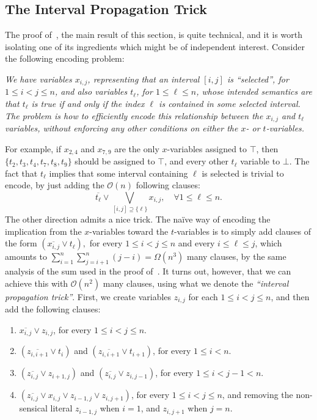 \documentclass[11pt]{article}
\renewcommand{\O}{\mathcal{O}}
\begin{document}
\subsection{The Interval Propagation Trick}\label{subsec:ipt}
The proof of~, the main result of this section, is quite technical, and it is worth isolating one of its ingredients which might be of independent interest.
Consider the following encoding problem: 
\begin{center}
\emph{We have variables $x_{i, j}$, representing that an interval $[i, j]$ is ``selected'', for $1 \leq i < j \leq n$, and also variables $t_\ell$, for $1 \leq \ell \leq n$, whose intended semantics are that $t_\ell$ is true if and only if the index $\ell$ is contained in some selected interval. The problem is how to efficiently encode this relationship between the $x_{i, j}$ and $t_\ell$ variables, without enforcing any other conditions on either the $x$- or $t$-variables.} 
\end{center}
For example, if $x_{2, 4}$ and $x_{7, 9}$ are the only $x$-variables assigned to $\top$, then $\{t_2, t_3, t_4, t_7, t_8, t_9\}$ should be assigned to $\top$, and every other $t_\ell$ variable to $\bot$. 
The fact that $t_\ell$ implies that some interval containing $\ell$ is selected is trivial to encode, by just adding the $\O(n)$ following clauses:
\[
\overline{t_\ell} \lor \bigvee_{[i, j] \supseteq \{\ell\}} x_{i, j}, \quad \forall 1 \leq \ell \leq n.
\]
The other direction admits a nice trick.
The naïve way of encoding the implication from the $x$-variables toward the $t$-variables is to simply add clauses of the form 
\(
(\overline{x_{i, j}} \lor t_\ell), 
\)
for every $1 \leq i < j \leq n$ and every $i \leq \ell \leq j$, which amounts to 
\(
 \sum_{i = 1}^{n} \sum_{j = i+1}^{n} (j-i) = \Omega(n^3)
\)
many clauses, by the same analysis of the sum used in the proof of~.
It turns out, however, that we can achieve this with $\O(n^2)$ many clauses, using what we denote the \emph{``interval propagation trick''}.
First, we create variables $z_{i, j}$ for each $1 \leq i < j \leq n$, and then add the following clauses:
\begin{enumerate}
    \item $\overline{x_{i, j}} \lor z_{i, j}$, for every $1 \leq i < j \leq n$.
    \item $(\overline{z_{i, i+1}} \lor t_i)$ and $(\overline{z_{i, i+1}} \lor t_{i+1})$, for every $1 \leq i < n$.
    \item $(\overline{z_{i, j}} \lor z_{i+1, j})$ and $(\overline{z_{i, j}} \lor z_{i, j-1})$, for every $1 \leq i < j-1 < n$.
    \item $(\overline{z_{i, j}} \lor x_{i, j} \lor z_{i-1, j} \lor z_{i, j+1})$, for every $1 \leq i < j \leq n$, and removing the non-sensical literal $z_{i-1, j}$ when $i=1$, and $z_{i, j+1}$ when $j = n$.
\end{enumerate}
\end{document}
